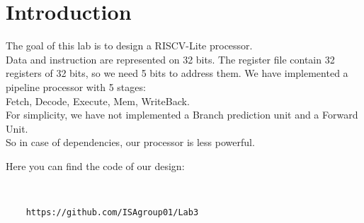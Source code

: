 \chapter{Introduction}
The goal of this lab is to design a RISCV-Lite processor.\\
Data and instruction are represented on 32 bits. The register file contain 32 registers
of 32 bits, so we need 5 bits to address them.
We have implemented a pipeline processor with 5 stages:\\
Fetch, Decode, Execute, Mem, WriteBack. \\
For simplicity, we have not implemented a Branch prediction unit and a Forward Unit.\\
So in case of dependencies, our processor is less powerful.
\vspace{1cm}
\\
\centerline{Here you can find the code of our design:}\\
\begin{verbatim}
	https://github.com/ISAgroup01/Lab3
\end{verbatim}
